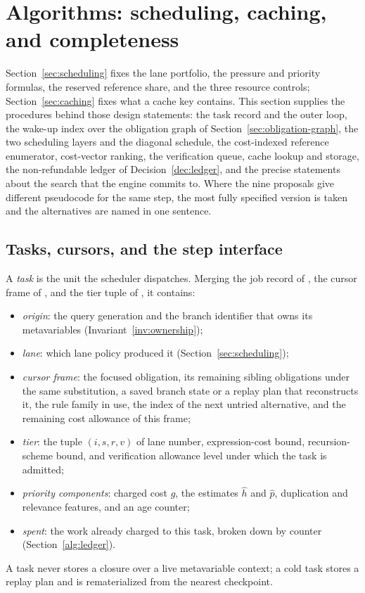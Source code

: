 \section{Algorithms: scheduling, caching, and completeness}\label{alg:scheduling}

Section~\ref{sec:scheduling} fixes the lane portfolio, the pressure and priority formulas, the reserved reference share, and the three resource controls; Section~\ref{sec:caching} fixes what a cache key contains. This section supplies the procedures behind those design statements: the task record and the outer loop, the wake-up index over the obligation graph of Section~\ref{sec:obligation-graph}, the two scheduling layers and the diagonal schedule, the cost-indexed reference enumerator, cost-vector ranking, the verification queue, cache lookup and storage, the non-refundable ledger of Decision~\ref{dec:ledger}, and the precise statements about the search that the engine commits to. Where the nine proposals give different pseudocode for the same step, the most fully specified version is taken and the alternatives are named in one sentence.

\subsection{Tasks, cursors, and the step interface}

\begin{definition}[Task]\label{def:task}
A \emph{task} is the unit the scheduler dispatches. Merging the job record of , the cursor frame of , and the tier tuple of , it contains:
\begin{itemize}
\item \emph{origin}: the query generation and the branch identifier that owns its metavariables (Invariant~\ref{inv:ownership});
\item \emph{lane}: which lane policy produced it (Section~\ref{sec:scheduling});
\item \emph{cursor frame}: the focused obligation, its remaining sibling obligations under the same substitution, a saved branch state or a replay plan that reconstructs it, the rule family in use, the index of the next untried alternative, and the remaining cost allowance of this frame;
\item \emph{tier}: the tuple $(i,s,r,v)$ of lane number, expression-cost bound, recursion-scheme bound, and verification allowance level under which the task is admitted;
\item \emph{priority components}: charged cost $g$, the estimates $\hat h$ and $\hat p$, duplication and relevance features, and an age counter;
\item \emph{spent}: the work already charged to this task, broken down by counter (Section~\ref{alg:ledger}).
\end{itemize}
A task never stores a closure over a live metavariable context; a cold task stores a replay plan and is rematerialized from the nearest checkpoint.
\end{definition}

